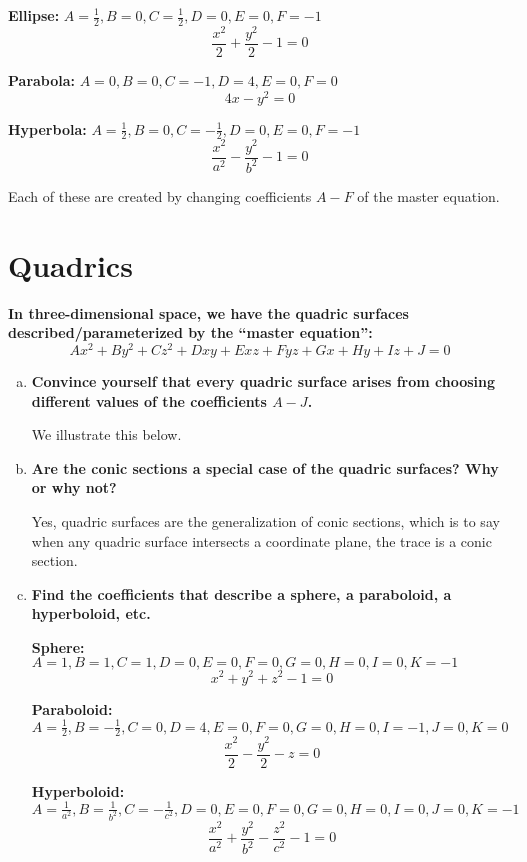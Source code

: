 \documentclass{article}
\begin{document}
\hspace{1cm} \textbf{Ellipse:} $A=\frac{1}{2}, B=0, C=\frac{1}{2}, D=0, E=0, F=-1$
    \[\frac{x^2}{2} + \frac{y^2}{2} - 1 = 0\]

\hspace{1cm} \textbf{Parabola:} $A=0, B=0, C=-1, D=4, E=0, F=0$
    \[4x - y^2 = 0\]

\hspace{1cm} \textbf{Hyperbola:} $A=\frac{1}{2}, B=0, C=-\frac{1}{2}, D=0, E=0, F=-1$ 
    \[\frac{x^2}{a^2} - \frac{y^2}{b^2} - 1 = 0\]

Each of these are created by changing coefficients $A-F$ of the master equation. 

\section{Quadrics}

\textbf{In three-dimensional space, we have the quadric surfaces described/parameterized by the “master equation”:}
\[Ax^2 + By^2 + Cz^2 + Dxy + Exz + Fyz + Gx + Hy + Iz + J = 0\]

\begin{enumerate}[a.]
    \item\textbf{Convince yourself that every quadric surface arises from choosing different values of the coefficients $A−J$.}
    
    We illustrate this below.
    
    \item\textbf{Are the conic sections a special case of the quadric surfaces? Why or why not?}
    
    Yes, quadric surfaces are the generalization of conic sections, which is to say when any quadric surface intersects a coordinate plane, the trace is a conic section.
    
    \item\textbf{Find the coefficients that describe a sphere, a paraboloid, a hyperboloid, etc.}
    
\hspace{1cm} \textbf{Sphere:} $A=1, B=1, C=1, D=0, E=0, F=0, G=0, H=0, I=0, K=-1$
    \[x^2 + y^2 + z^2 - 1 = 0\]

\hspace{1cm} \textbf{Paraboloid:} $A=\frac{1}{2}, B=-\frac{1}{2}, C=0, D=4, E=0, F=0, G=0, H=0, I=-1, J=0, K=0$
    \[\frac{x^2}{2} - \frac{y^2}{2} - z = 0\]

\hspace{1cm} \textbf{Hyperboloid:} $A=\frac{1}{a^2}, B=\frac{1}{b^2}, C=-\frac{1}{c^2}, D=0, E=0, F=0, G=0, H=0, I=0, J=0, K=-1$ 
    \[\frac{x^2}{a^2} + \frac{y^2}{b^2} - \frac{z^2}{c^2} - 1 = 0\]

\end{enumerate}
\end{document}
